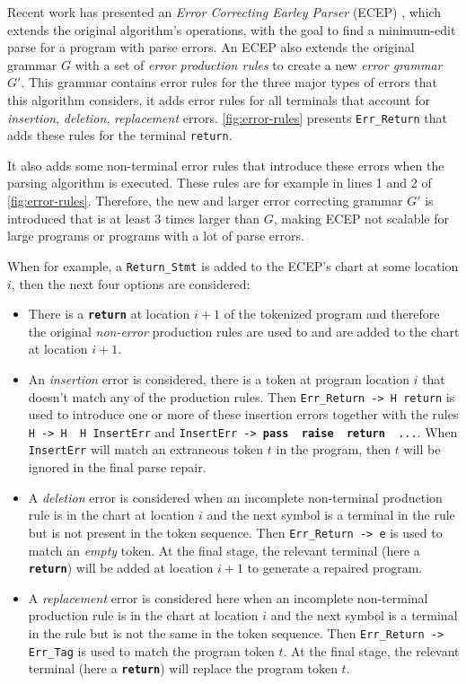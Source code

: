 Recent work has presented an \emph{Error
Correcting Earley Parser} (ECEP) \citep{Aho_1972}, which extends the original
algorithm's operations, with the goal to find a minimum-edit parse for a program
with parse errors. An ECEP also extends the original grammar $G$ with a set of
\emph{error production rules} to create a new \emph{error grammar} $G'$. This
grammar contains error rules for the three major types of errors that this
algorithm considers, \ie it adds error rules for all terminals that account for
\emph{insertion}, \emph{deletion}, \emph{replacement} errors.
\autoref{fig:error-rules} presents \texttt{Err\_Return} that adds these rules
for the terminal \texttt{return}.

It also adds some non-terminal error rules that introduce these errors when the
parsing algorithm is executed. These rules are for example in lines 1 and 2 of
\autoref{fig:error-rules}. Therefore, the new and larger error correcting
grammar $G'$ is introduced that is at least 3 times larger than $G$, making ECEP
not scalable for large programs or programs with a lot of parse errors.

When for example, a \texttt{Return\_Stmt} is added to the ECEP's chart at some
location $i$, then the next four options are considered:
\begin{itemize}
  \item There is a \texttt{\bfseries return} at location $i+1$ of the tokenized
  program and therefore the original \emph{non-error} production rules are used
  to and are added to the chart at location $i+1$.
  \item An \emph{insertion} error is considered, \ie there is a token at program
  location $i$ that doesn't match any of the production rules. Then
  \texttt{Err\_Return -> H return} is used to introduce one or more of these
  insertion errors together with the rules \texttt{H -> H \textbar\ H InsertErr}
  and \texttt{InsertErr -> \textbf{pass} \textbar\ \textbf{raise} \textbar\
  \textbf{return} \textbar\ ...}. When \texttt{InsertErr} will match an
  extraneous token $t$ in the program, then $t$ will be ignored in the final
  parse repair.
  \item A \emph{deletion} error is considered when an incomplete non-terminal
  production rule is in the chart at location $i$ and the next symbol is a
  terminal in the rule but is not present in the token sequence. Then
  \texttt{Err\_Return -> e} is used to match an \emph{empty} token. At the final
  stage, the relevant terminal (here a \texttt{\textbf{return}}) will be added
  at location $i+1$ to generate a repaired program.
  \item A \emph{replacement} error is considered here when an incomplete
  non-terminal production rule is in the chart at location $i$ and the next
  symbol is a terminal in the rule but is not the same in the token sequence.
  Then \texttt{Err\_Return -> Err\_Tag} is used to match the program token $t$.
  At the final stage, the relevant terminal (here a \texttt{\textbf{return}})
  will replace the program token $t$.
\end{itemize}

